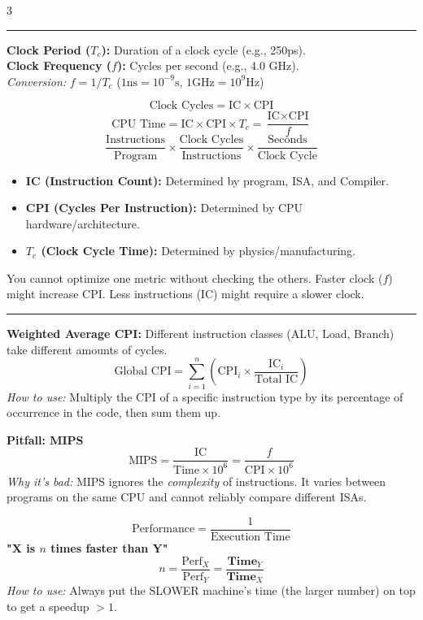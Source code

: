 \documentclass[6pt, letterpaper]{article}
\newcommand{\sectionhead}[1]{%
    \vspace{1mm}{\large\bfseries#1}\vspace{0.2mm}\hrule\vspace{0.8mm}%
}
\begin{document}
\begin{multicols}{3}
\sectionhead{CPU Clocking \& The Iron Law}
\textbf{Clock Period ($T_c$):} Duration of a clock cycle (e.g., 250ps). \\
\textbf{Clock Frequency ($f$):} Cycles per second (e.g., 4.0 GHz). \\
\textit{Conversion:} $f = 1 / T_c$ \quad ($1 \text{ns} = 10^{-9}\text{s}$, $1 \text{GHz} = 10^9\text{Hz}$)

\columnbreak

\begin{tcolorbox}[colback=red!5, colframe=black, boxrule=0.5pt, title=\textbf{The Iron Law of Performance}]
\[ \text{Clock Cycles} = \text{IC} \times \text{CPI} \]
\[ \text{CPU Time} = \text{IC} \times \text{CPI} \times T_c = \frac{\text{IC} \times \text{CPI}}{f} \]
\[ \frac{\text{Instructions}}{\text{Program}} \times \frac{\text{Clock Cycles}}{\text{Instructions}} \times \frac{\text{Seconds}}{\text{Clock Cycle}}\]
\begin{itemize}
    \item \textbf{IC (Instruction Count):} Determined by program, ISA, and Compiler.
    \item \textbf{CPI (Cycles Per Instruction):} Determined by CPU hardware/architecture.
    \item \textbf{$T_c$ (Clock Cycle Time):} Determined by physics/manufacturing.
\end{itemize}
You cannot optimize one metric without checking the others. Faster clock ($f$) might increase CPI. Less instructions (IC) might require a slower clock.
\end{tcolorbox}

\sectionhead{Advanced CPI \& MIPS}
\textbf{Weighted Average CPI:} Different instruction classes (ALU, Load, Branch) take different amounts of cycles.
\[ \text{Global CPI} = \sum_{i=1}^{n} \left( \text{CPI}_i \times \frac{\text{IC}_i}{\text{Total IC}} \right) \]
\textit{How to use:} Multiply the CPI of a specific instruction type by its percentage of occurrence in the code, then sum them up.

\textbf{Pitfall: MIPS}
\[ \text{MIPS} = \frac{\text{IC}}{\text{Time} \times 10^6} = \frac{f}{\text{CPI} \times 10^6} \]
\textit{Why it's bad:} MIPS ignores the \textit{complexity} of instructions. It varies between programs on the same CPU and cannot reliably compare different ISAs.


\begin{tcolorbox}[colback=blue!5, colframe=black, boxrule=0.5pt, title=\textbf{Relative Performance}]
\[ \text{Performance} = \frac{1}{\text{Execution Time}} \]
\textbf{"X is $n$ times faster than Y"}
\[ n = \frac{\text{Perf}_X}{\text{Perf}_Y} = \frac{\textbf{Time}_Y}{\textbf{Time}_X} \]
\textit{How to use:} Always put the SLOWER machine's time (the larger number) on top to get a speedup $> 1$.
\end{tcolorbox}


\end{multicols}
\end{document}
